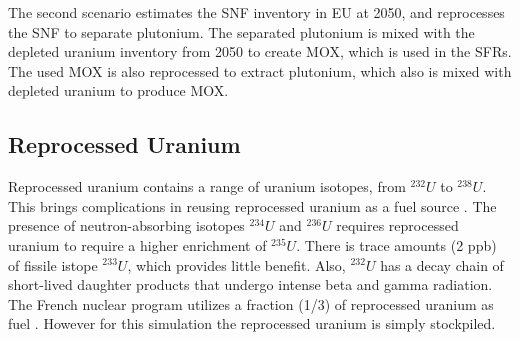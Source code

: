 The second scenario estimates the \gls{SNF} inventory in EU at 2050,
and reprocesses the \gls{SNF} to separate plutonium. The separated
plutonium is mixed with the depleted uranium inventory from 2050
to create \gls{MOX}, which is used in the \gls{SFR}s. The used
\gls{MOX} is also reprocessed to extract plutonium, which also
is mixed with depleted uranium to produce \gls{MOX}.



\subsection{Reprocessed Uranium}
Reprocessed uranium contains a range of uranium isotopes, from $^{232}U$ to $^{238}U$.
This brings complications in reusing reprocessed uranium as a fuel source \cite{IAEA_management_2007}.
The presence of neutron-absorbing isotopes $^{234}U$ and $^{236}U$ requires reprocessed uranium
to require a higher enrichment of $^{235}U$. There is trace amounts (2 ppb) of fissile istope $^{233}U$,
which provides little benefit.  
Also, $^{232}U$ has a decay chain of short-lived
daughter products that undergo intense beta and gamma radiation.
The French nuclear program utilizes a fraction (1/3) of reprocessed uranium as fuel \cite{IAEA_management_200&}.
However for this simulation the reprocessed uranium is simply stockpiled.


